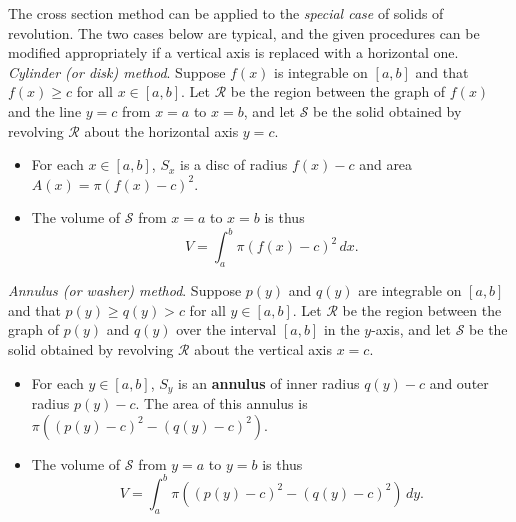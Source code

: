 \begin{namedtheorem} The cross section method can be applied to the {\em special case} of solids of revolution. The two cases below are typical, and the given procedures can be modified appropriately if a vertical axis is replaced with a horizontal one.
\vspace{.1in}
\\
{\em Cylinder (or disk) method}. Suppose $f(x)$ is integrable on $[a,b]$ and that $f(x)\geq c$ for all $x\in [a,b]$. Let $\mathcal{R}$ be the region between the graph of $f(x)$ and the line $y=c$ from $x=a$ to $x=b$, and let $\mathcal{S}$ be the solid obtained by revolving $\mathcal{R}$ about the horizontal axis $y=c$.
\begin{itemize}
  \item For each $x\in [a,b]$, $S_x$ is a disc of radius $f(x)-c$ and area $A(x)=\pi(f(x)-c)^2$.
  \item The volume of $\mathcal{S}$ from $x=a$ to $x=b$ is thus
  \[
  V=\int_a^b \pi(f(x)-c)^2\, dx.
  \]
\end{itemize}
{\em Annulus (or washer) method}. Suppose $p(y)$ and $q(y)$ are integrable on $[a,b]$ and that $p(y)\geq q(y)> c$ for all $y\in [a,b]$. Let $\mathcal{R}$ be the region between the graph of $p(y)$ and $q(y)$ over the interval $[a,b]$ in the $y$-axis, and let $\mathcal{S}$ be the solid obtained by revolving $\mathcal{R}$ about the vertical axis $x=c$.
\begin{itemize}
  \item For each $y\in [a,b]$, $S_y$ is an {\bf annulus} of inner radius $q(y)-c$ and outer radius $p(y)-c$. The area of this annulus is $\pi((p(y)-c)^2-(q(y)-c)^2)$.
  \item The volume of $\mathcal{S}$ from $y=a$ to $y=b$ is thus
  \[
  V=\int_a^b \pi((p(y)-c)^2-(q(y)-c)^2)\, dy.
  \]
\end{itemize}
\end{namedtheorem}

